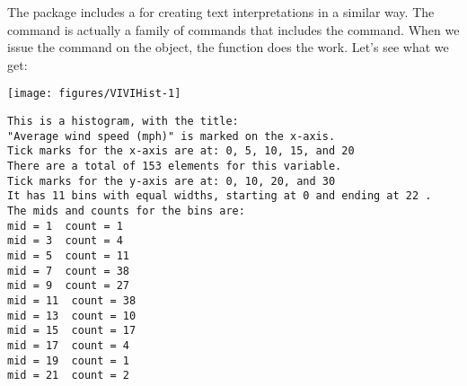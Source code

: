 The  package includes a  for creating text interpretations in a similar way. The  command is actually a family of commands that includes the  command. When we issue the  command on the  object, the  function does the work. Let's see what we get: 
\begin{knitrout}
\color{fgcolor}\begin{kframe}
\begin{alltt}
\hlstd{> }\hlstd{(}\hlopt{$} \hlstd{=}\hlstd{,} \hlstd{=}\hlstd{))}
\end{alltt}
\end{kframe}
\texttt{[image: figures/VIVIHist-1]} 
\begin{kframe}\begin{verbatim}
This is a histogram, with the title: 
"Average wind speed (mph)" is marked on the x-axis.
Tick marks for the x-axis are at: 0, 5, 10, 15, and 20 
There are a total of 153 elements for this variable.
Tick marks for the y-axis are at: 0, 10, 20, and 30 
It has 11 bins with equal widths, starting at 0 and ending at 22 .
The mids and counts for the bins are:
mid = 1  count = 1 
mid = 3  count = 4 
mid = 5  count = 11 
mid = 7  count = 38 
mid = 9  count = 27 
mid = 11  count = 38 
mid = 13  count = 10 
mid = 15  count = 17 
mid = 17  count = 4 
mid = 19  count = 1 
mid = 21  count = 2
\end{verbatim}
\end{kframe}
\end{knitrout}
 
